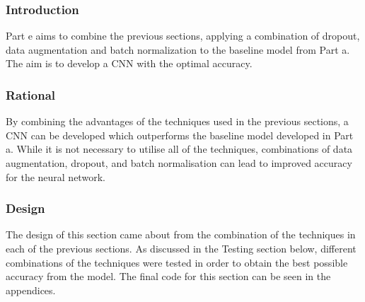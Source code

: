 \subsubsection{Introduction}

Part e aims to combine the previous sections, applying a combination of dropout,
data augmentation and batch normalization to the baseline model from Part a.
The aim is to develop a CNN with the optimal accuracy.

\subsubsection{Rational}

By combining the advantages of the techniques used in the previous sections,
a CNN can be developed which outperforms the baseline model developed in Part a.
While it is not necessary to utilise all of the techniques, combinations of data
augmentation, dropout, and batch normalisation can lead to improved accuracy
for the neural network.

\subsubsection{Design}

The design of this section came about from the combination of the techniques in
each of the previous sections. As discussed in the Testing section below,
different combinations of the techniques were tested in order to obtain the best
possible accuracy from the model. The final code for this section can be seen in
the appendices.

